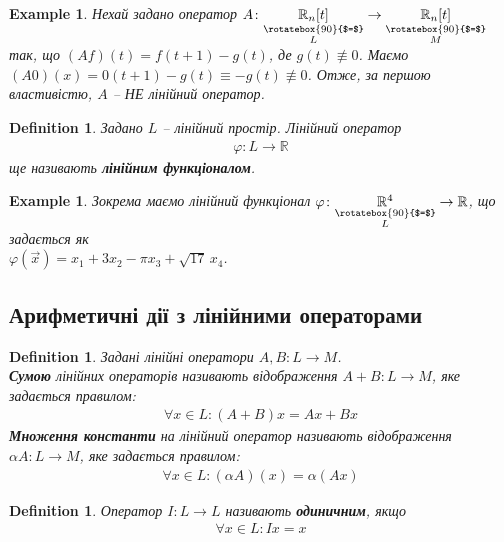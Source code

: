 \documentclass[a4paper, 10pt]{article}
\theoremstyle{theoremdd}
\newtheorem{definition}[theorem]{Definition}
\newtheorem{example}[theorem]{Example}
\begin{document}
	\begin{example}
	Нехай задано оператор $A \colon \underset{\substack{\rotatebox{90}{$=$} \\ L}}{\mathbb{R}_n[t]} \to \underset{\substack{\rotatebox{90}{$=$} \\ M}}{\mathbb{R}_n[t]}$ так, що \quad $(Af)(t) = f(t+1) - g(t)$, де $g(t) \not\equiv 0$. Маємо $(A0)(x) = 0(t+1) - g(t) \equiv -g(t) \not\equiv 0$. Отже, за першою властивістю, $A$ -- НЕ лінійний оператор.
	\end{example}
	
	\begin{definition}
	Задано $L$ -- лінійний простір. Лінійний оператор
	\begin{align*}
	\varphi \colon L \to \mathbb{R}
	\end{align*}
	ще називають \textbf{лінійним функціоналом}.
	\end{definition}
	
	\begin{example}
	Зокрема маємо лінійний функціонал $\varphi \colon \underset{\substack{\rotatebox{90}{$=$} \\ L}}{\mathbb{R}^4} \to \mathbb{R}$, що задається як \\ $\varphi(\vec{x}) = x_1 + 3x_2 - \pi x_3 + \sqrt{17}\,x_4$.
	\end{example}
	
	\subsection{Арифметичні дії з лінійними операторами}
	\begin{definition}
	Задані лінійні оператори $A,B \colon L \to M$.\\
	\textbf{Сумою} лінійних операторів називають відображення $A+B \colon L \to M$, яке задається правилом:
	\begin{align*}
	\forall x \in L: (A+B)x = Ax+Bx
	\end{align*}
	\textbf{Множення константи} на лінійний оператор називають відображення $\alpha A \colon L \to M$, яке задається правилом:
	\begin{align*}
	\forall x \in L: (\alpha A)(x) = \alpha (Ax)
	\end{align*}
	\end{definition}
	
	\begin{definition}
	Оператор $I \colon L \to L$ називають \textbf{одиничним}, якщо
	\begin{align*}
	\forall x \in L: Ix = x
	\end{align*}
	\end{definition}
	
\end{document}
